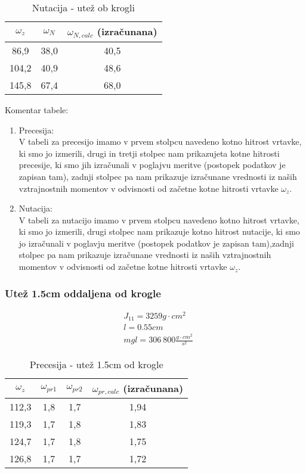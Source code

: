 \documentclass[11pt, a4paper]{article}
\theoremstyle{definition}
\theoremstyle{example}
\theoremstyle{izrek}
\begin{document}
\begin{table}[h]
	\centering
	\begin{tabular}{|c|c|c|}
		\hline
		\rule{0pt}{3ex}   
		$\omega_z$ & $\omega_{N}$ & $\omega_{N,calc}$\: (izračunana)\\
		\hline
		\hline
		86,9 &	38,0 &	 40,5\\  
		\hline
		104,2 &	40,9 &	 48,6\\  
		\hline
		145,8 &	67,4 &	 68,0 \\ 
		\hline
		
		
	\end{tabular}
\caption{Nutacija - utež ob krogli}
\end{table}
Komentar tabele: \\
\begin{enumerate}
\item Precesija: \\
V tabeli za precesijo imamo v prvem stolpcu navedeno  kotno hitrost vrtavke, ki smo jo izmerili, drugi in tretji stolpec nam prikazujeta kotne hitrosti precesije, ki smo jih izračunali v poglajvu meritve (postopek podatkov je zapisan tam), zadnji stolpec pa nam prikazuje izračunane vrednosti iz naših vztrajnostnih momentov v odvisnosti od začetne kotne hitrosti vrtavke $\omega_z$.
\item Nutacija: \\
V tabeli za nutacijo imamo v prvem stolpcu navedeno kotno hitrost vrtavke, ki smo jo izmerili, drugi stolpec nam prikazuje kotno hitrost nutacije, ki smo jo izračunali v poglavju meritve (postopek podatkov je zapisan tam),zadnji stolpec pa nam prikazuje izračunane vrednosti iz naših vztrajnostnih momentov v odvisnosti od začetne kotne hitrosti vrtavke $\omega_z$.
\end{enumerate}


\pagebreak
\subsubsection{Utež 1.5cm oddaljena od krogle}

\begin{align*}
& J_{11} = 3259g\cdot cm^2\\ 
& l = 0.55 cm\\
& mgl = 306\: 800\frac{g\cdot cm^2}{s^2}
\end{align*}

\begin{table}[h]
	\centering
	\begin{tabular}{|c|c|c|c|}
		\hline
		\rule{0pt}{3ex}   
		$\omega_z$ & $\omega_{pr1}$\: & $\omega_{pr2}$\: & $\omega_{pr,calc}$\: (izračunana)\\
		\hline
		\hline
		112,3 &	1,8 &	1,7 &	1,94\\
		\hline
		119,3 &	1,7 &	1,8 &	1,83\\
		\hline
		124,7 &	1,7 &	1,8 &	1,75\\
		\hline
		126,8 &	1,7 &	1,7 &	1,72\\
		\hline
		
		
	\end{tabular}
	\caption{Precesija - utež 1.5cm od krogle}
\end{table}
\end{document}
